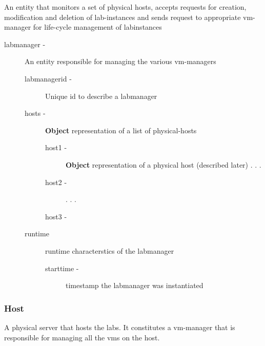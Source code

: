 \documentclass[11pt]{article}
\begin{document}
     An entity that monitors a set of physical hosts, accepts requests for
     creation, modification and deletion of lab-instances and sends
     request to appropriate vm-manager for life-cycle management of
     labinstances

\begin{description}
\item [labmanager -] An entity responsible for managing the various vm-managers

\begin{description}
\item [labmanagerid -] Unique id to describe a labmanager
\item [hosts -] \textbf{Object} representation of a list of physical-hosts

\begin{description}
\item [host1 -] \textbf{Object} representation of a physical host (described later)
            .
            .
            .
\item [host2 -]
            .
            .
            .
\item [host3 -]
\end{description}

\item [runtime] runtime characterstics of the labmanager

\begin{description}
\item [starttime -] timestamp the labmanager was instantiated
\end{description}

\end{description}

\end{description}
\subsubsection{Host}
\label{sec-3.2.4}


     A physical server that hosts the labs. It constitutes a
     vm-manager that is responsible for managing all the vms on the
     host.
\end{document}
